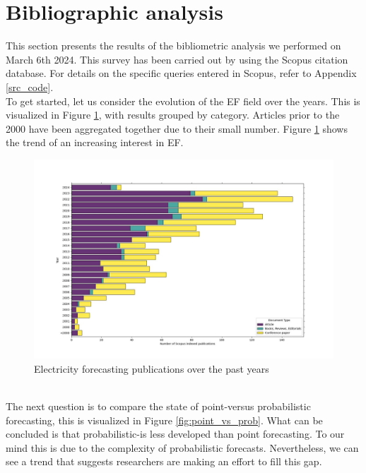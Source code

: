 \section{Bibliographic analysis}
This section presents the results of the bibliometric analysis we performed on March 6th 2024. This survey has been carried out by using the Scopus citation database. For details on the specific queries entered in Scopus, refer to Appendix \ref{src_code}.
\\
To get started, let us consider the evolution of the EF field over the years. This is visualized in Figure \ref{fig:epf_evolution}, with results grouped by category. Articles prior to the 2000 have been aggregated together due to their small number. Figure \ref{fig:epf_evolution} shows the trend of an increasing interest in EF.
\begin{figure}
    \includegraphics[width=\textwidth]{images/epf_evolution1.jpg}
    \caption{Electricity forecasting publications over the past years}
    \label{fig:epf_evolution}
  \end{figure}
\\
The next question is to compare the state of point-versus probabilistic forecasting, this is visualized in Figure \ref{fig:point_vs_prob}. What can be concluded is that probabilistic-is less developed than point forecasting. To our mind this is due to the complexity of probabilistic forecasts.
Nevertheless, we can see a trend that suggests researchers are making an effort to fill this gap.
